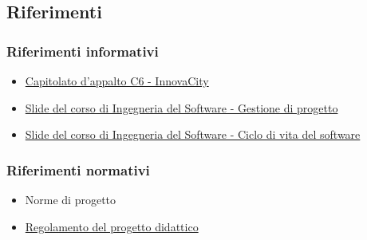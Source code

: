\subsection{Riferimenti}
\subsubsection{Riferimenti informativi}
    \begin{itemize}
        \item \href {https://www.math.unipd.it/~tullio/IS-1/2023/Progetto/C6.pdf} {Capitolato d'appalto C6 - InnovaCity}
        \item \href{https://www.math.unipd.it/~tullio/IS-1/2023/Dispense/T4.pdf} {Slide del corso di Ingegneria del Software - Gestione di progetto}
        \item \href{https://www.math.unipd.it/~tullio/IS-1/2023/Dispense/T2.pdf} {Slide del corso di Ingegneria del Software - Ciclo di vita del software}
    \end{itemize}

\subsubsection{Riferimenti normativi}
    \begin{itemize}
    \item Norme di progetto
    \item \href {https://www.math.unipd.it/~tullio/IS-1/2023/Dispense/PD2.pdf} {Regolamento del progetto didattico}
    \end{itemize}
